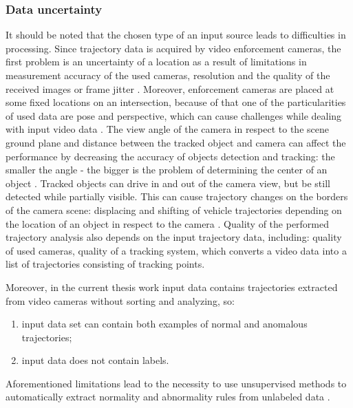 \subsubsection{Data uncertainty}

It should be noted that the chosen type of an input source leads to difficulties in processing. Since trajectory data is acquired by video enforcement cameras, the first problem is an uncertainty of a location as a result of limitations in measurement accuracy of the used cameras, resolution and the quality of the received images or frame jitter \cite{article:4_detect_eatp}. Moreover, enforcement cameras are placed at some fixed locations on an intersection, because of that one of the particularities of used data are pose and perspective, which can cause challenges while dealing with input video data \cite{article:6_survey_anom_det_rtuvs}. The view angle of the camera in respect to the scene ground plane and distance between the tracked object and camera can affect the performance by decreasing the accuracy of objects detection and tracking: the smaller the angle - the bigger is the problem of determining the center of an object \cite{article:9_trb_vc_aev_sc}\cite{article:4_detect_eatp}. Tracked objects can drive in and out of the camera view, but be still detected while partially visible. This can cause trajectory changes on the borders of the camera scene: displacing and shifting of vehicle trajectories depending on the location of an object in respect to the camera \cite{article:4_detect_eatp}. Quality of the performed trajectory analysis also depends on the input trajectory data, including: quality of used cameras, quality of a tracking system, which converts a video data into a list of trajectories consisting of tracking points.

Moreover, in the current thesis work input data contains trajectories extracted from video cameras without sorting and analyzing, so:
\begin{enumerate}
	\item input data set can contain both examples of normal and anomalous trajectories;
	\item input data does not contain labels.
\end{enumerate}

Aforementioned limitations lead to the necessity to use unsupervised methods to automatically extract normality and abnormality rules from unlabeled data \cite{article:27_vna_cad_td}.